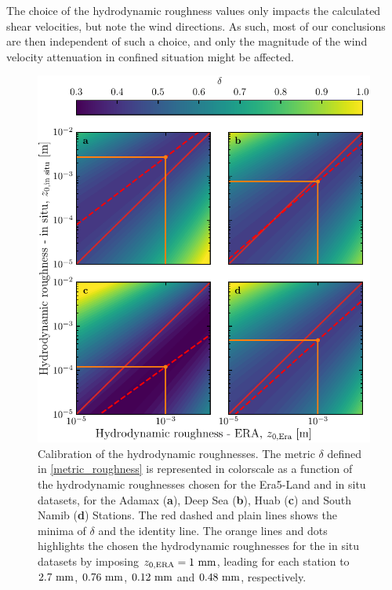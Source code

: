 The choice of the hydrodynamic roughness values only impacts the calculated shear velocities, but note the wind directions. As such, most of our conclusions are then independent of such a choice, and only the magnitude of the wind velocity attenuation in confined situation might be affected.


\begin{figure}
  \centering
  \includegraphics[scale=1]{Figures/Figure3_supp.pdf}
  \caption{Calibration of the hydrodynamic roughnesses. The metric $\delta$ defined in \eqref{metric_roughness} is represented in colorscale as a function of the hydrodynamic roughnesses chosen for the Era5-Land and in situ datasets, for the Adamax (\textbf{a}), Deep Sea (\textbf{b}), Huab (\textbf{c}) and South Namib (\textbf{d}) Stations. The red dashed and plain lines shows the minima of $\delta$ and the identity line. The orange lines and dots highlights the chosen the hydrodynamic roughnesses for the in situ datasets by imposing $z_{0, \textup{\textup{ERA}}} = 1~\textup{mm}$, leading for each station to $2.7~\textup{mm}$, $0.76~\textup{mm}$, $0.12~\textup{mm}$ and $0.48~\textup{mm}$, respectively.}
  \label{Fig3_supp}
\end{figure}


